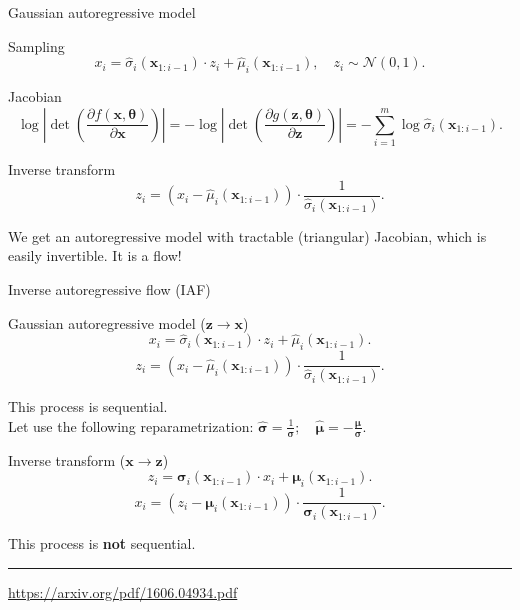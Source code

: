 \documentclass{beamer}
\newcommand{\bx}{\mathbf{x}}
\newcommand{\bz}{\mathbf{z}}
\newcommand{\bmu}{\boldsymbol{\mu}}
\newcommand{\bsigma}{\boldsymbol{\sigma}}
\newcommand{\btheta}{\boldsymbol{\theta}}
\begin{document}
\begin{frame}{Gaussian autoregressive model}
	\begin{block}{Sampling}
		\vspace{-0.5cm}
		\[
		x_i = \hat{\sigma}_i (\bx_{1:i-1}) \cdot z_i + \hat{\mu}_i(\bx_{1:i-1}), \quad z_i \sim \mathcal{N}(0, 1).
		\]
		\vspace{-0.5cm}
	\end{block}
	\begin{block}{Jacobian}
		\vspace{-0.5cm}
		\[
		\log \left|\det \left( \frac{\partial f(\bx, \btheta)}{\partial \bx} \right) \right| = -\log \left|\det \left( \frac{\partial g(\bz, \btheta)}{\partial \bz} \right) \right| = - \sum_{i = 1}^m \log \hat{\sigma}_i (\bx_{1:i-1}).
		\]
		\vspace{-0.5cm}
	\end{block} 
	\begin{block}{Inverse transform}
		\vspace{-0.5cm}
		\[
		z_i = \left(x_i - \hat{\mu}_i(\bx_{1:i-1}) \right) \cdot \frac{1}{\hat{\sigma}_i (\bx_{1:i-1}) }.
		\]
	\end{block}
	We get an autoregressive model with tractable (triangular) Jacobian, which is easily invertible. It is a flow!
\end{frame}
\begin{frame}{Inverse autoregressive flow (IAF)}
	
	\begin{block}{Gaussian autoregressive model ($\bz \rightarrow \bx$)}
		\vspace{-0.2cm}
		\[
			x_i = \hat{\sigma}_i (\bx_{1:i-1}) \cdot z_i + \hat{\mu}_i(\bx_{1:i-1}).
		\]
		\[
			z_i = \left(x_i - \hat{\mu}_i(\bx_{1:i-1}) \right) \cdot \frac{1}{ \hat{\sigma}_i (\bx_{1:i-1})}.
		\]
		\vspace{-0.3cm}
	\end{block}
	This process is sequential. \\
	Let use the following reparametrization:
	$\hat{\bsigma} = \frac{1}{\bsigma}; \quad \hat{\bmu} = - \frac{\bmu}{\bsigma}.$
	
	\begin{block}{Inverse transform ($\bx \rightarrow \bz$)}
		\vspace{-0.2cm}
		\[
			z_i = \bsigma_i (\bx_{1:i-1}) \cdot x_i + \bmu_i(\bx_{1:i-1}).
		\]
		\[
			x_i = \left( z_i - \bmu_i(\bx_{1:i-1})\right) \cdot \frac{1}{\bsigma_i (\bx_{1:i-1}) }.
		\]
		\vspace{-0.3cm}
	\end{block}
	This process is \textbf{not} sequential.
	\vfill
	\hrule\medskip
	{\scriptsize \href{https://arxiv.org/pdf/1606.04934.pdf}{https://arxiv.org/pdf/1606.04934.pdf}} 
\end{frame}
\end{document}
